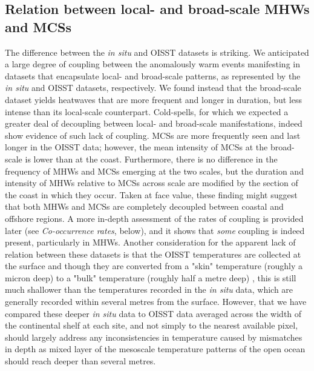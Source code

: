 \documentclass[a4paper,10pt,review]{elsarticle}
\begin{document}
\subsection{Relation between local- and broad-scale MHWs and MCSs}
The difference between the \emph{in situ} and OISST datasets is striking. We anticipated a large degree of coupling between the anomalously warm events manifesting in datasets that encapsulate local- and broad-scale patterns, as represented by the \emph{in situ} and OISST datasets, respectively. We found instead that the broad-scale dataset yields heatwaves that are more frequent and longer in duration, but less intense than its local-scale counterpart. Cold-spells, for which we expected a greater deal of decoupling between local- and broad-scale manifestations, indeed show evidence of such lack of coupling. MCSs are more frequently seen and last longer in the OISST data; however, the mean intensity of MCSs at the broad-scale is lower than at the coast. Furthermore, there is no difference in the frequency of MHWs and MCSs emerging at the two scales, but the duration and intensity of MHWs relative to MCSs across scale are modified by the section of the coast in which they occur. Taken at face value, these finding might suggest that both MHWs and MCSs are completely decoupled between coastal and offshore regions. A more in-depth assessment of the rates of coupling is provided later (see \emph{Co-occurrence rates}, below), and it shows that \emph{some} coupling is indeed present, particularly in MHWs. Another consideration for the apparent lack of relation between these datasets is that the OISST temperatures are collected at the surface and though they are converted from a "skin" temperature (roughly a micron deep) to a "bulk" temperature (roughly half a metre deep) \citep{Reynolds2007}, this is still much shallower than the temperatures recorded in the \emph{in situ} data, which are generally recorded within several metres from the surface. However, that we have compared these deeper \emph{in situ} data to OISST data averaged across the width of the continental shelf at each site, and not simply to the nearest available pixel, should largely address any inconsistencies in temperature caused by mismatches in depth as mixed layer of the mesoscale temperature patterns of the open ocean should reach deeper than several metres.
\end{document}
